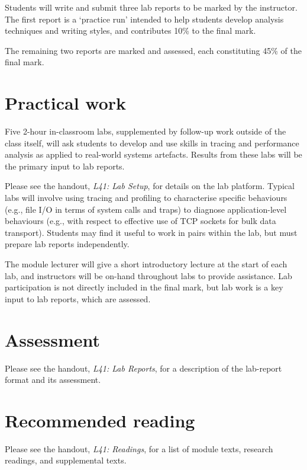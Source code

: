 \documentclass[a4paper,10pt]{article}
\begin{document}
Students will write and submit three lab reports to be marked by the
instructor.
The first report is a `practice run' intended to help students develop 
analysis techniques and writing styles, and contributes 10\% to the final
mark.

The remaining two reports are marked and assessed, each constituting 45\% of
the final mark.

\section{Practical work}

Five 2-hour in-classroom labs, supplemented by follow-up work outside of the
class itself, will ask students to develop and use skills in tracing and 
performance analysis as applied to real-world systems artefacts.
Results from these labs will be the primary input to lab reports.

Please see the handout, \textit{L41: Lab Setup}, for details on the lab
platform.
Typical labs will involve using tracing and profiling to characterise specific
behaviours (e.g., file I/O in terms of system calls and traps) to diagnose
application-level behaviours (e.g., with respect to effective use of TCP
sockets for bulk data transport).
Students may find it useful to work in pairs within the lab, but must prepare
lab reports independently.

The module lecturer will give a short introductory lecture at the start of
each lab, and instructors will be on-hand throughout labs to provide
assistance.
Lab participation is not directly included in the final mark, but lab work is
a key input to lab reports, which are assessed.

\section{Assessment}

Please see the handout, \textit{L41: Lab Reports}, for a description of the
lab-report format and its assessment.

\section{Recommended reading}

Please see the handout, \textit{L41: Readings}, for a list of module texts,
research readings, and supplemental texts.
\end{document}
